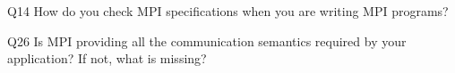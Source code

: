 \begin{description}%
\item{Q14} How do you check MPI specifications when you are writing MPI programs?%
\item{Q26} Is MPI providing all the communication semantics required by your application? If not, what is missing?%
\end{description}%
